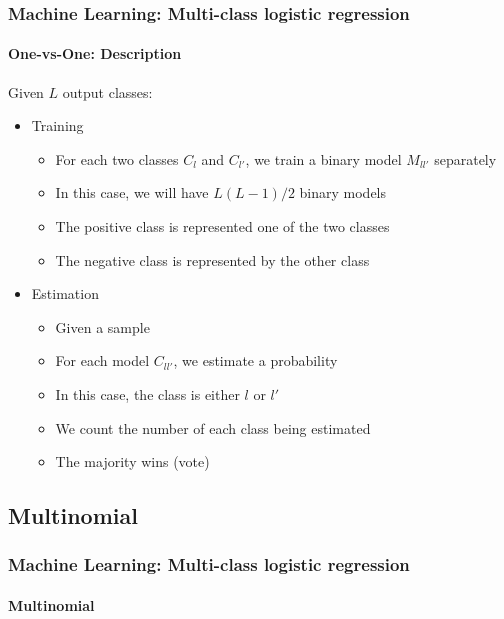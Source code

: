 \documentclass[xcolor=table]{beamer}
\begin{document}
\begin{frame}
	\frametitle{Machine Learning: Multi-class logistic regression}
	\framesubtitle{One-vs-One: Description}
	
	Given $L$ output classes:
	\begin{itemize}
		\item Training
		\begin{itemize}
			\item For each two classes $C_{l}$ and $C_{l'}$, we train a binary model $M_{ll'}$ separately
			\item In this case, we will have $L (L-1)/2$ binary models
			\item The positive class is represented one of the two classes
			\item The negative class is represented by the other class
		\end{itemize}
		\item Estimation
		\begin{itemize}
			\item Given a sample
			\item For each model $C_{ll'}$, we estimate a probability
			\item In this case, the class is either $l$ or $l'$
			\item We count the number of each class being estimated
			\item The majority wins (vote)
		\end{itemize}
	\end{itemize}
	
\end{frame}

\subsection{Multinomial}

\begin{frame}
	\frametitle{Machine Learning: Multi-class logistic regression}
	\framesubtitle{Multinomial}
	
	\begin{center}
	\end{center}
	
\end{frame}
\end{document}
